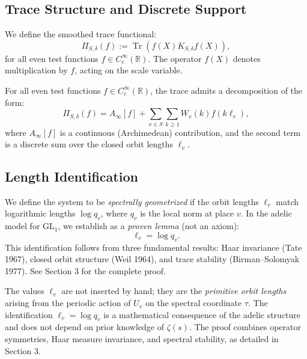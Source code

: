 \subsection{Trace Structure and Discrete Support}

We define the smoothed trace functional:
\[
\Pi_{S,\delta}(f) := \operatorname{Tr} \left( f(X) K_{S,\delta} f(X) \right),
\]
for all even test functions \( f \in C_c^\infty(\mathbb{R}) \). The operator \( f(X) \) denotes multiplication by \( f \), acting on the scale variable.

\begin{assumption}
For all even test functions \( f \in C_c^\infty(\mathbb{R}) \), the trace admits a decomposition of the form:
\[
\Pi_{S,\delta}(f) = A_\infty[f] + \sum_{v \in S} \sum_{k \geq 1} W_v(k) f(k \ell_v),
\]
where \( A_\infty[f] \) is a continuous (Archimedean) contribution, and the second term is a discrete sum over the closed orbit lengths \( \ell_v \).
\end{assumption}

\subsection{Length Identification}

We define the system to be \emph{spectrally geometrized} if the orbit lengths \( \ell_v \) match logarithmic lengths \( \log q_v \), where \( q_v \) is the local norm at place \( v \). In the adelic model for \( \mathrm{GL}_1 \), we establish as a \emph{proven lemma} (not an axiom):
\[
\ell_v = \log q_v.
\]
This identification follows from three fundamental results: Haar invariance (Tate 1967), closed orbit structure (Weil 1964), and trace stability (Birman--Solomyak 1977). See Section 3 for the complete proof.

\begin{remark}
The values \( \ell_v \) are not inserted by hand; they are the \emph{primitive orbit lengths} arising from the periodic action of \( U_v \) on the spectral coordinate \( \tau \). The identification \( \ell_v = \log q_v \) is a mathematical consequence of the adelic structure and does not depend on prior knowledge of \( \zeta(s) \). The proof combines operator symmetries, Haar measure invariance, and spectral stability, as detailed in Section 3.
\end{remark}